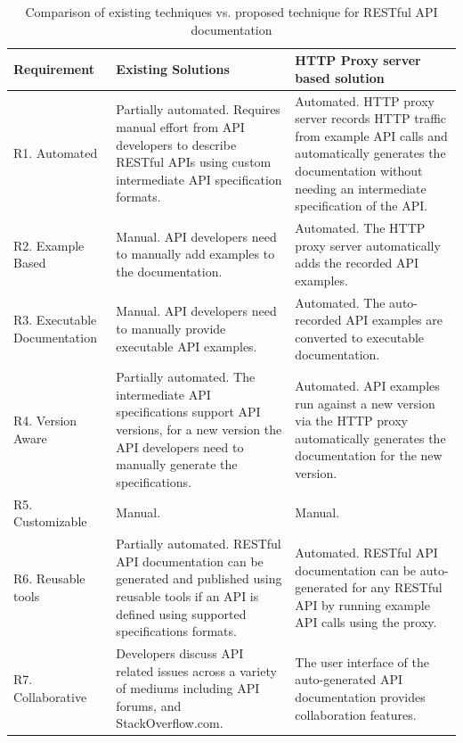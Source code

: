 \documentclass[11pt,oneside]{book}
\begin{document}
\begin{table}

  \caption{Comparison of existing techniques vs. proposed technique for RESTful API documentation}
  \begin{tabular}{|p{1in}|p{2in}|p{2in}|}
    \hline
    Requirement & Existing Solutions & HTTP Proxy server based solution\\
    \hline
    R1. Automated
    & Partially automated. Requires manual effort from API developers to describe RESTful APIs using custom intermediate API specification formats.
    & Automated. HTTP proxy server records HTTP traffic from example API calls and automatically generates the documentation without needing an intermediate specification of the API.\\
    \hline
    R2. Example Based
    & Manual. API developers need to manually add examples to the documentation.
    & Automated. The HTTP proxy server automatically adds the recorded API examples.\\
    \hline
    R3. Executable Documentation
    & Manual. API developers need to manually provide executable API examples.
    & Automated. The auto-recorded API examples are converted to executable documentation.\\
    \hline
    R4. Version Aware
    & Partially automated. The intermediate API specifications support API versions, for a new version the API developers need to manually generate the specifications.
    & Automated. API examples run against a new version via the HTTP proxy automatically generates the documentation for the new version.\\
    \hline
    R5. Customizable
    & Manual.
    & Manual.\\
    \hline
    R6. Reusable tools
    & Partially automated. RESTful API documentation can be generated and published using reusable tools if an API is defined using supported specifications formats.
    & Automated. RESTful API documentation can be auto-generated for any RESTful API by running example API calls using the proxy.\\
    \hline
    R7. Collaborative
    & Developers discuss API related issues across a variety of mediums including API forums, and StackOverflow.com.
    & The user interface of the auto-generated API documentation provides collaboration features.\\
    \hline

  \end{tabular}
  \label{tab:compare}
\end{table}
\end{document}
